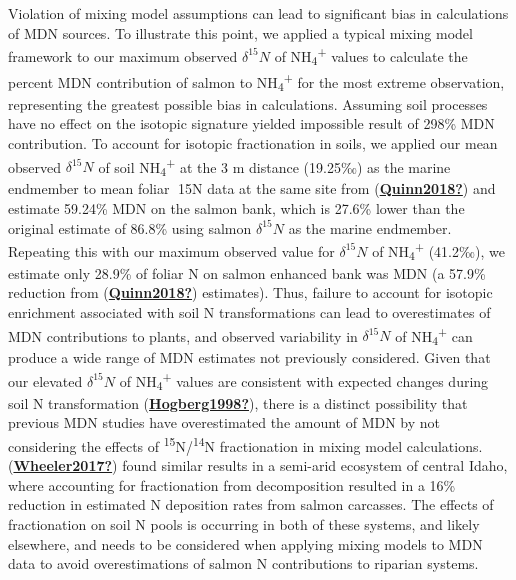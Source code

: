 \documentclass [11pt, proquest] {uwthesis}[2015/03/03]
\begin{document}
Violation of mixing model assumptions can lead to significant bias in calculations of MDN sources. To illustrate this point, we applied a typical mixing model framework to our maximum observed \(\delta^{15}N\) of NH\textsubscript{4}\textsuperscript{+} values to calculate the percent MDN contribution of salmon to NH\textsubscript{4}\textsuperscript{+} for the most extreme observation, representing the greatest possible bias in calculations. Assuming soil processes have no effect on the isotopic signature yielded impossible result of 298\% MDN contribution. To account for isotopic fractionation in soils, we applied our mean observed \(\delta^{15}N\) of soil NH\textsubscript{4}\textsuperscript{+} at the 3 m distance (19.25‰) as the marine endmember to mean foliar 15N data at the same site from (\protect\hyperlink{ref-Quinn2018}{\textbf{Quinn2018?}}) and estimate 59.24\% MDN on the salmon bank, which is 27.6\% lower than the original estimate of 86.8\% using salmon \(\delta^{15}N\) as the marine endmember. Repeating this with our maximum observed value for \(\delta^{15}N\) of NH\textsubscript{4}\textsuperscript{+} (41.2‰), we estimate only 28.9\% of foliar N on salmon enhanced bank was MDN (a 57.9\% reduction from (\protect\hyperlink{ref-Quinn2018}{\textbf{Quinn2018?}}) estimates). Thus, failure to account for isotopic enrichment associated with soil N transformations can lead to overestimates of MDN contributions to plants, and observed variability in \(\delta^{15}N\) of NH\textsubscript{4}\textsuperscript{+} can produce a wide range of MDN estimates not previously considered. Given that our elevated \(\delta^{15}N\) of NH\textsubscript{4}\textsuperscript{+} values are consistent with expected changes during soil N transformation (\protect\hyperlink{ref-Hogberg1998}{\textbf{Hogberg1998?}}), there is a distinct possibility that previous MDN studies have overestimated the amount of MDN by not considering the effects of \textsuperscript{15}N/\textsuperscript{14}N fractionation in mixing model calculations. (\protect\hyperlink{ref-Wheeler2017}{\textbf{Wheeler2017?}}) found similar results in a semi-arid ecosystem of central Idaho, where accounting for fractionation from decomposition resulted in a 16\% reduction in estimated N deposition rates from salmon carcasses. The effects of fractionation on soil N pools is occurring in both of these systems, and likely elsewhere, and needs to be considered when applying mixing models to MDN data to avoid overestimations of salmon N contributions to riparian systems.
\end{document}

